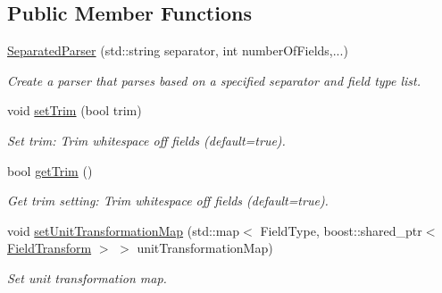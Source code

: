 \subsection*{Public Member Functions}
\begin{DoxyCompactItemize}
\item 
\hyperlink{classtudat_1_1input__output_1_1SeparatedParser_a2884db18b99d13bb08527adf970b23a3}{Separated\+Parser} (std\+::string separator, int number\+Of\+Fields,...)
\begin{DoxyCompactList}\small\item\em Create a parser that parses based on a specified separator and field type list. \end{DoxyCompactList}\item 
void \hyperlink{classtudat_1_1input__output_1_1SeparatedParser_aadfe06db77dad0e00fed3e10df912930}{set\+Trim} (bool trim)\hypertarget{classtudat_1_1input__output_1_1SeparatedParser_aadfe06db77dad0e00fed3e10df912930}{}\label{classtudat_1_1input__output_1_1SeparatedParser_aadfe06db77dad0e00fed3e10df912930}

\begin{DoxyCompactList}\small\item\em Set trim\+: Trim whitespace off fields (default=true). \end{DoxyCompactList}\item 
bool \hyperlink{classtudat_1_1input__output_1_1SeparatedParser_ac9c449e559cfa47f0ea1394f1b0a4331}{get\+Trim} ()\hypertarget{classtudat_1_1input__output_1_1SeparatedParser_ac9c449e559cfa47f0ea1394f1b0a4331}{}\label{classtudat_1_1input__output_1_1SeparatedParser_ac9c449e559cfa47f0ea1394f1b0a4331}

\begin{DoxyCompactList}\small\item\em Get trim setting\+: Trim whitespace off fields (default=true). \end{DoxyCompactList}\item 
void \hyperlink{classtudat_1_1input__output_1_1SeparatedParser_af8f8dca044d81c0658de37c6fc5b4115}{set\+Unit\+Transformation\+Map} (std\+::map$<$ Field\+Type, boost\+::shared\+\_\+ptr$<$ \hyperlink{classtudat_1_1input__output_1_1FieldTransform}{Field\+Transform} $>$ $>$ unit\+Transformation\+Map)
\begin{DoxyCompactList}\small\item\em Set unit transformation map. \end{DoxyCompactList}\end{DoxyCompactItemize}
